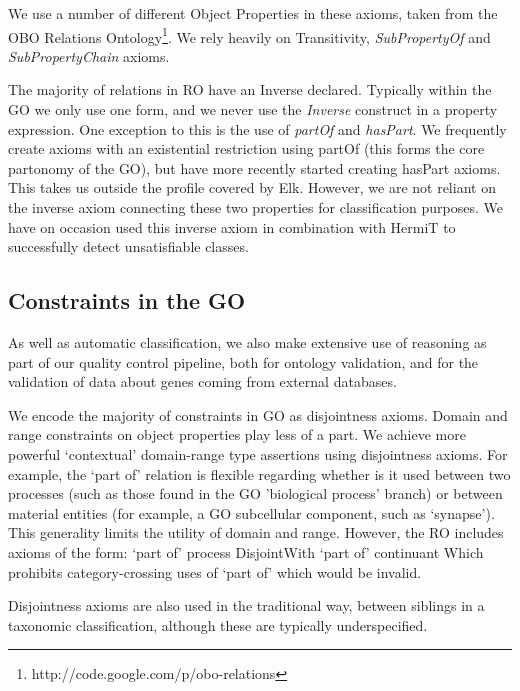 \documentclass{llncs}
\begin{document}
We use a number of different Object Properties in these axioms, taken
from the OBO Relations
Ontology\footnote{http://code.google.com/p/obo-relations}. We rely
heavily on Transitivity, \emph{SubPropertyOf} and
\emph{SubPropertyChain} axioms.

The majority of relations in RO have an Inverse declared. Typically
within the GO we only use one form, and we never use the
\emph{Inverse} construct in a property expression. One exception to
this is the use of \emph{partOf} and \emph{hasPart}. We frequently
create axioms with an existential restriction using partOf (this forms
the core partonomy of the GO), but have more recently started creating
hasPart axioms\cite{berardini2010gene}. This takes us outside the
profile covered by Elk. However, we are not reliant on the inverse
axiom connecting these two properties for classification purposes. We
have on occasion used this inverse axiom in combination with HermiT to
successfully detect unsatisfiable classes.

\subsection{Constraints in the GO}

As well as automatic classification, we also make extensive use of
reasoning as part of our quality control pipeline, both for ontology
validation, and for the validation of data about genes coming from
external databases.

We encode the majority of constraints in GO as disjointness axioms.
Domain and range constraints on object properties play less of a
part. We achieve more powerful ‘contextual’ domain-range type
assertions using disjointness axioms. For example, the `part of'
relation is flexible regarding whether is it used between two
processes (such as those found in the GO 'biological process' branch)
or between material entities (for example, a GO subcellular component,
such as ‘synapse’). This generality limits the utility of domain and
range. However, the RO includes axioms of the form: `part of' process
DisjointWith `part of' continuant Which prohibits category-crossing
uses of `part of' which would be invalid.

Disjointness axioms are also used in the traditional way, between
siblings in a taxonomic classification, although these are typically
underspecified.
\end{document}
